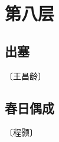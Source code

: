 \documentclass[12pt,UTF-8,openany]{ctexbook}
\begin{document}
\vspace{8pt}


\chapter{第八层}

\section{出塞}

\begin{center}
    \vspace{10pt}
    
    \begin{normalsize}
        
        〔王昌龄〕
        
    \end{normalsize}
    
    \vspace{8pt}
    
    \begin{large}
        
        
        
    \end{large}
    
\end{center}

\vspace{8pt}


\section{春日偶成}

\begin{center}
    \vspace{10pt}
    
    \begin{normalsize}
        
        〔程颢〕
        
    \end{normalsize}
    
    \vspace{8pt}
    
    \begin{large}
        
        
        
    \end{large}
    
\end{center}
\end{document}
